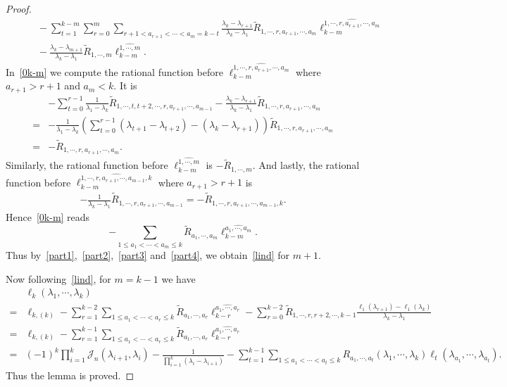 \documentclass[10pt,a4paper]{amsart}
\newcommand{\nn}{\nonumber}
\begin{document}
\begin{proof}
\begin{align}
		&\qquad -\sum_{t=1}^{k-m}\sum_{r=0}^{m}\sum_{r+1<a_{r+1}<\cdots<a_m=k-t} \frac{\lambda_k-\lambda_{r+1}}{\lambda_k-\lambda_1}\widetilde R_{1,\cdots,r,a_{r+1},\cdots,a_m}\ell_{k-m}^{\widehat{1,\cdots,r,a_{r+1},\cdots,a_m}}\nn\\
		&\qquad -\frac{\lambda_k-\lambda_{m+1}}{\lambda_k-\lambda_1}\widetilde R_{1,\cdots,m}\ell_{k-m}^{\widehat{1,\cdots,m}}.\label{0k-m}
	\end{align}
	In~\eqref{0k-m} we compute the rational function before $\ell_{k-m}^{\widehat{1,\cdots,r,a_{r+1},\cdots,a_{m}}}$ where $a_{r+1}>r+1$ and $a_{m}<k$. It is
	\begin{align}
		&-\sum_{t=0}^{r-1}\frac{1}{\lambda_1-\lambda_k}\widetilde R_{1,\cdots,t,t+2,\cdots,r,a_{r+1},\cdots,a_{m-1}}-\frac{\lambda_k-\lambda_{r+1}}{\lambda_k-\lambda_1}\widetilde R_{1,\cdots,r,a_{r+1},\cdots,a_m} \nn\\
		=&-\frac{1}{\lambda_1-\lambda_k}\left(\sum_{t=0}^{r-1}(\lambda_{t+1}-\lambda_{t+2})-(\lambda_k-\lambda_{r+1})\right)\widetilde R_{1,\cdots,r,a_{r+1},\cdots,a_{m}} \nn\\
		=&-\widetilde R_{1,\cdots,r,a_{r+1},\cdots,a_m}.
	\end{align}
	Similarly, the rational function before $\ell_{k-m}^{\widehat{1,\cdots,m}}$ is $-\widetilde R_{1,\cdots,m}$. And lastly, the rational function before $\ell_{k-m}^{\widehat{1,\cdots,r,a_{r+1},\cdots,a_{m-1},k}}$ where $a_{r+1}>r+1$ is
	\begin{align}
	-\frac{1}{\lambda_k-\lambda_1}\widetilde R_{1,\cdots,r,a_{r+1},\cdots,a_{m-1}} =-\widetilde R_{1,\cdots,r,a_{r+1},\cdots,a_{m-1},k}.
	\end{align}
	Hence~\eqref{0k-m} reads
	\begin{equation}
		-\sum_{1\le a_1<\cdots<a_m\le k}\widetilde R_{a_1,\cdots,a_m}\ell_{k-m}^{\widehat{a_1,\cdots,a_m}}. \label{part4}
	\end{equation}
	Thus by~\eqref{part1},~\eqref{part2},~\eqref{part3} and~\eqref{part4}, we obtain~\eqref{lind} for $m+1$.
	
	Now following~\eqref{lind}, for $m=k-1$ we have
	\begin{align}
		&\ell_k(\lambda_1,\cdots,\lambda_k)\nn\\
		=& \ell_{k,(k)}-\sum_{r=1}^{k-2}\sum_{1\le a_1<\cdots<a_r\le k}\widetilde R_{a_1,\cdots,a_r}\ell_{k-r}^{\widehat{a_1,\cdots,a_r}}-\sum_{r=0}^{k-2}\widetilde R_{1,\cdots,r,r+2,\cdots,k-1}\frac{\ell_1(\lambda_{r+1})-\ell_1(\lambda_k)}{\lambda_k-\lambda_1} \nn\\
		=& \ell_{k,(k)}-\sum_{r=1}^{k-1}\sum_{1\le a_1<\cdots<a_r\le k}\widetilde R_{a_1,\cdots,a_r}\ell_{k-r}^{\widehat{a_1,\cdots,a_r}} \nn\\
		=&(-1)^k\prod_{i=1}^k\mathcal J_n(\lambda_{i+1},\lambda_i)-\frac{1}{\prod_{i=1}^k(\lambda_i-\lambda_{i+1})}-\sum_{t=1}^{k-1}\sum_{1\le a_1<\cdots<a_t\le k}R_{a_1,\cdots,a_t}(\lambda_1,\cdots,\lambda_k)\ell_t(\lambda_{a_1},\cdots,\lambda_{a_t}).
	\end{align}
	Thus the lemma is proved.
\end{proof}
\end{document}
